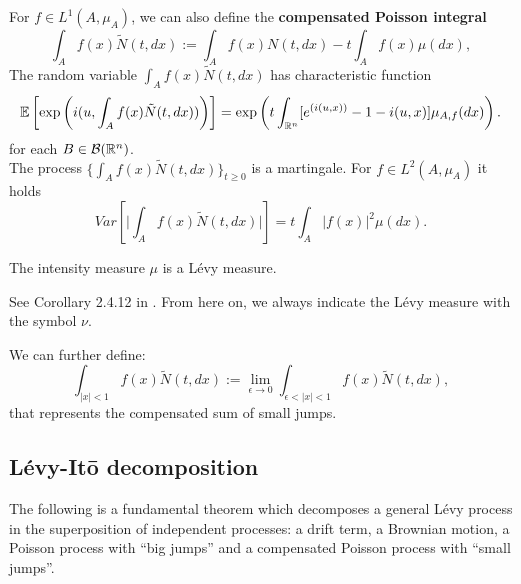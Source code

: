 \noindent
For $f \in L^1(A,\mu_A)$, we can also define the \textbf{compensated Poisson integral}
\begin{equation}
  \int_A f(x) \tilde{N}(t,dx) := \int_A f(x) N(t,dx) - t \int_A f(x) \mu(dx), 
\end{equation}
The random variable $\int_A f(x) \tilde{N}(t,dx)$ has characteristic function
\begin{equation}
  \mathbb{E} \left[ \exp \left( i(u,\int_A f(x) \tilde{N}(t,dx)) \right) \right] = 
  \exp \left( t \int_{\mathbb{R}^n} [e^{(i(u,x))}-1-i(u,x)] \mu_{A,f}(dx) \right).
\end{equation}
for each $B \in \mathcal{B}(\mathbb{R}^n)$. \\
The process $\{\int_A f(x) \tilde N(t,dx)\}_{t \ge 0}$ is a martingale. For $f \in L^2(A,\mu_A)$ it holds
\begin{equation}
 Var \left[ \biggr|\int_A f(x) \tilde N(t,dx)\biggr|\right] = t \int_A |f(x)|^2 \mu(dx).
\end{equation}
\begin{Theorem}
 The intensity measure $\mu$ is a Lévy measure.
\end{Theorem}
 See Corollary 2.4.12 in \cite{Applebaum}. From here on, we always indicate the Lévy measure with the symbol $\nu$.
 
We can further define:
\begin{equation}
\int_{|x|<1} f(x) \tilde N(t,dx) := \lim_{\epsilon \to 0} \int_{\epsilon < |x| < 1} f(x) \tilde N(t,dx), 
\end{equation}
that represents the compensated sum of small jumps.

 
\subsection{Lévy-It\={o} decomposition}

The following is a fundamental theorem which decomposes a general Lévy process in the superposition 
of independent processes: a drift term, a Brownian motion, a Poisson process with ``big jumps'' and a compensated Poisson process with ``small jumps''.

